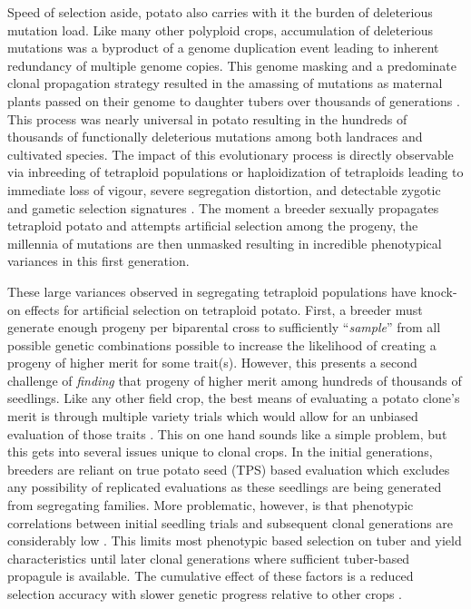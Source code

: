\documentclass[
]{article}
\begin{document}
Speed of selection aside, potato also carries with it the burden of
deleterious mutation load. Like many other polyploid crops, accumulation
of deleterious mutations was a byproduct of a genome duplication event
leading to inherent redundancy of multiple genome copies. This genome
masking and a predominate clonal propagation strategy resulted in the
amassing of mutations as maternal plants passed on their genome to
daughter tubers over thousands of generations \autocite{Lian2019}. This
process was nearly universal in potato resulting in the hundreds of
thousands of functionally deleterious mutations among both landraces and
cultivated species. The impact of this evolutionary process is directly
observable via inbreeding of tetraploid populations or haploidization of
tetraploids leading to immediate loss of vigour, severe segregation
distortion, and detectable zygotic and gametic selection signatures
\autocite{Zhang2019,Song2023}. The moment a breeder sexually propagates
tetraploid potato and attempts artificial selection among the progeny,
the millennia of mutations are then unmasked resulting in incredible
phenotypical variances in this first generation.

These large variances observed in segregating tetraploid populations
have knock-on effects for artificial selection on tetraploid potato.
First, a breeder must generate enough progeny per biparental cross to
sufficiently ``\emph{sample}'' from all possible genetic combinations
possible to increase the likelihood of creating a progeny of higher
merit for some trait(s). However, this presents a second challenge of
\emph{finding} that progeny of higher merit among hundreds of thousands
of seedlings. Like any other field crop, the best means of evaluating a
potato clone's merit is through multiple variety trials which would
allow for an unbiased evaluation of those traits \autocite{Smith2005}.
This on one hand sounds like a simple problem, but this gets into
several issues unique to clonal crops. In the initial generations,
breeders are reliant on true potato seed (TPS) based evaluation which
excludes any possibility of replicated evaluations as these seedlings
are being generated from segregating families. More problematic,
however, is that phenotypic correlations between initial seedling trials
and subsequent clonal generations are considerably low
\autocite{Maris1988,Gu2025}. This limits most phenotypic based selection
on tuber and yield characteristics until later clonal generations where
sufficient tuber-based propagule is available. The cumulative effect of
these factors is a reduced selection accuracy with slower genetic
progress relative to other crops \autocite{Gopal2015}.
\end{document}
